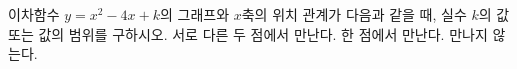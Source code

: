 이차함수 $y=x^2-4x+k$의 그래프와 $x$축의 위치 관계가 다음과 같을 때, 실수 $k$의 값 또는 값의 범위를 구하시오.
 서로 다른 두 점에서 만난다.
 한 점에서 만난다.
 만나지 않는다.
